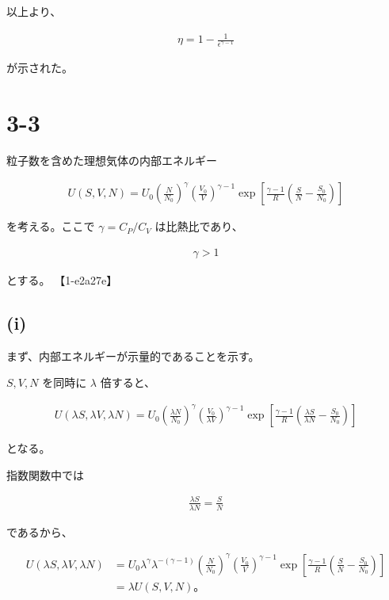 \documentclass[platex,dvipdfmx,a4paper]{jsarticle}
\begin{document}
以上より、

\begin{align*}
\eta
=
1-
\frac{1}{\epsilon^{\gamma-1}}
\end{align*}

が示された。
\section{3-3}

粒子数を含めた理想気体の内部エネルギー

\begin{align*}
U(S,V,N)
=
U_0
\left(
\frac{N}{N_0}
\right)^{\gamma}
\left(
\frac{V_0}{V}
\right)^{\gamma-1}
\exp\left[
\frac{\gamma-1}{R}
\left(
\frac{S}{N}-\frac{S_0}{N_0}
\right)
\right]
\end{align*}

を考える。ここで $\gamma=C_P/C_V$ は比熱比であり、

\begin{align*}
\gamma>1
\end{align*}

とする。 【1-e2a27e】

\subsection{(i)}

まず、内部エネルギーが示量的であることを示す。

$S,V,N$ を同時に $\lambda$ 倍すると、

\begin{align*}
U(\lambda S,\lambda V,\lambda N)
=
U_0
\left(
\frac{\lambda N}{N_0}
\right)^\gamma
\left(
\frac{V_0}{\lambda V}
\right)^{\gamma-1}
\exp\left[
\frac{\gamma-1}{R}
\left(
\frac{\lambda S}{\lambda N}
-\frac{S_0}{N_0}
\right)
\right]
\end{align*}

となる。

指数関数中では

\begin{align*}
\frac{\lambda S}{\lambda N}
=
\frac{S}{N}
\end{align*}

であるから、

\begin{align*}
U(\lambda S,\lambda V,\lambda N)
&=
U_0
\lambda^\gamma
\lambda^{-(\gamma-1)}
\left(
\frac{N}{N_0}
\right)^\gamma
\left(
\frac{V_0}{V}
\right)^{\gamma-1}
\exp\left[
\frac{\gamma-1}{R}
\left(
\frac{S}{N}
-\frac{S_0}{N_0}
\right)
\right] \\
&=
\lambda
U(S,V,N)。
\end{align*}
\end{document}
